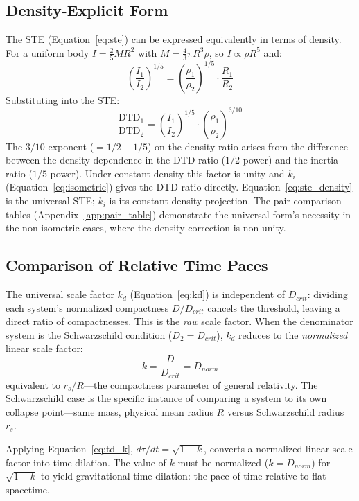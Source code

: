 \documentclass[twoside,twocolumn,9pt]{article}
\begin{document}
\subsection{Density-Explicit Form}

The STE (Equation~\ref{eq:ste}) can be expressed equivalently in terms of density. For a uniform body $I = \frac{2}{5}MR^2$ with $M = \frac{4}{3}\pi R^3 \rho$, so $I \propto \rho R^5$ and:
\begin{equation} \label{eq:ki}
\left(\frac{I_1}{I_2}\right)^{1/5} = \left(\frac{\rho_1}{\rho_2}\right)^{1/5} \cdot \frac{R_1}{R_2}
\end{equation}
Substituting into the STE:
\begin{equation} \label{eq:ste_density}
\frac{\text{DTD}_1}{\text{DTD}_2} = \left(\frac{I_1}{I_2}\right)^{1/5} \cdot \left(\frac{\rho_1}{\rho_2}\right)^{3/10}
\end{equation}
The $3/10$ exponent ($= 1/2 - 1/5$) on the density ratio arises from the difference between the density dependence in the DTD ratio ($1/2$ power) and the inertia ratio ($1/5$ power). Under constant density this factor is unity and $k_i$ (Equation~\ref{eq:isometric}) gives the DTD ratio directly. Equation~\ref{eq:ste_density} is the universal STE; $k_i$ is its constant-density projection. The pair comparison tables (Appendix~\ref{app:pair_table}) demonstrate the universal form's necessity in the non-isometric cases, where the density correction is non-unity.

\subsection{Comparison of Relative Time Paces}
The universal scale factor $k_d$ (Equation~\ref{eq:kd}) is independent of $D_{crit}$: dividing each system's normalized compactness $D/D_{crit}$ cancels the threshold, leaving a direct ratio of compactnesses. This is the \textit{raw} scale factor. When the denominator system is the Schwarzschild condition ($D_2 = D_{crit}$), $k_d$ reduces to the \textit{normalized} linear scale factor:
\[
k = \frac{D}{D_{crit}} = D_{norm}
\]
equivalent to $r_s/R$---the compactness parameter of general relativity. The Schwarzschild case is the specific instance of comparing a system to its own collapse point---same mass, physical mean radius $R$ versus Schwarzschild radius $r_s$.

Applying Equation~\ref{eq:td_k}, $d\tau/dt = \sqrt{1-k}$, converts a normalized linear scale factor into time dilation. The value of $k$ must be normalized ($k = D_{norm}$) for $\sqrt{1-k}$ to yield gravitational time dilation: the pace of time relative to flat spacetime.
\end{document}
